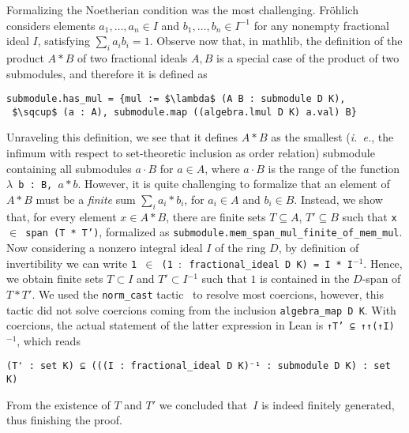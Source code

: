 \documentclass[sn-mathphys]{sn-jnl}%
\newcommand{\inv}{\ensuremath{{}^{-1}}}
\newcommand{\lean}[1]{\texttt{#1}\xspace}
\newcommand{\mathlib}{\textsf{mathlib}\xspace}
\begin{document}
Formalizing the Noetherian condition was the most challenging. Fr\"ohlich considers elements $a_1, \dots, a_n \in I$ and $b_1, \dots, b_n \in I^{-1}$ for any nonempty fractional ideal $I$,
satisfying $ \sum_i a_i b_i = 1 $. Observe now that, in \mathlib, the definition of the product $A\ast B$ of two fractional ideals $A,B$ is a special case of the product of two submodules, and therefore it is defined as
\begin{lstlisting}
submodule.has_mul = {mul := $\lambda$ (A B : submodule D K),
 $\sqcup$ (a : A), submodule.map ((algebra.lmul D K) a.val) B}
\end{lstlisting}
Unraveling this definition, we see that it defines $A\ast B$ as the smallest (\emph{i.~e.}, the infimum with respect to set-theoretic inclusion as order relation) submodule containing all submodules $a\cdot B$ for $a\in A$, where $a \cdot B$ is the range of the function \lean{$\lambda$ b : B, $a\ast b$}. However, it is quite challenging to formalize that an element of $A\ast B$ must be a \emph{finite} sum $\sum_{i} a_i*b_i$, for $a_i \in A$ and $b_i \in B$. Instead, we show that, for every element $x\in A\ast B$, there are finite sets $T\subseteq A$, $T'\subseteq B$ such that \lean{x $\in$ span (T * T')}, formalized as
\lean{submodule.mem\_span\_mul\_finite\-\_of\-\_mem\-\_mul}.
Now considering a nonzero integral ideal $I$ of the ring $D$, by definition of invertibility we can write \lean{1 $\in$ (1 $:$ fractional\_ideal D K) = I * I\inv}. Hence, we obtain 
finite sets $T \subset I$ and $T' \subset I\inv$ such that $1$ is contained in the $D$-span of $T*T'$. We used the \lean{norm\_cast} tactic~\cite{norm_cast} to resolve most coercions, however, this tactic did not solve coercions coming from the inclusion \lean{algebra\_map D K}. With coercions, the actual statement of the latter expression in Lean is \lean{↑T' ⊆ ↑↑(↑I)\inv}, which reads
\begin{lstlisting}
(T' : set K) ⊆ (((I : fractional_ideal D K)⁻¹ : submodule D K) : set K)
\end{lstlisting}
From the existence of $T$ and $T'$ we concluded that~$I$ is indeed finitely generated, thus finishing the proof.
\end{document}
